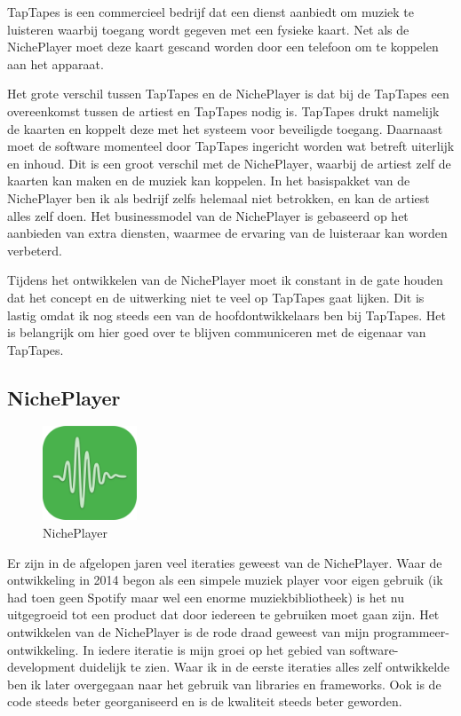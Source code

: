 TapTapes is een commercieel bedrijf dat een dienst aanbiedt om muziek te luisteren waarbij toegang wordt gegeven met een fysieke kaart. Net als de NichePlayer moet deze kaart gescand worden door een telefoon om te koppelen aan het apparaat.

Het grote verschil tussen TapTapes en de NichePlayer is dat bij de TapTapes een overeenkomst tussen de artiest en TapTapes nodig is. TapTapes drukt namelijk de kaarten  en koppelt deze met het systeem voor beveiligde toegang. Daarnaast moet de software momenteel door TapTapes ingericht worden wat betreft uiterlijk en inhoud. Dit is een groot verschil met de NichePlayer, waarbij de artiest zelf de kaarten kan maken en de muziek kan koppelen. In het basispakket van de NichePlayer ben ik als bedrijf zelfs helemaal niet betrokken, en kan de artiest alles zelf doen. Het businessmodel van de NichePlayer is gebaseerd op het aanbieden van extra diensten, waarmee de ervaring van de luisteraar kan worden verbeterd.

Tijdens het ontwikkelen van de NichePlayer moet ik constant in de gate houden dat het concept en de uitwerking niet te veel op TapTapes gaat lijken. Dit is lastig omdat ik nog steeds een van de hoofdontwikkelaars ben bij TapTapes. Het is belangrijk om hier goed over te blijven communiceren met de eigenaar van TapTapes.

\subsection{NichePlayer}
\begin{figure}
    \centering
    \includegraphics[width=0.25\textwidth]{assets/critical-review/NichePlayer.png}
    \caption{NichePlayer}
    \label{fig:critical-review:NichePlayer}
\end{figure}

Er zijn in de afgelopen jaren veel iteraties geweest van de NichePlayer. Waar de ontwikkeling in 2014 begon als een simpele muziek player voor eigen gebruik (ik had toen geen Spotify maar wel een enorme muziekbibliotheek) is het nu uitgegroeid tot een product dat door iedereen te gebruiken moet gaan zijn. Het ontwikkelen van de NichePlayer is de rode draad geweest van mijn programmeer-ontwikkeling. In iedere iteratie is mijn groei op het gebied van software-development duidelijk te zien. Waar ik in de eerste iteraties alles zelf ontwikkelde ben ik later overgegaan naar het gebruik van libraries en frameworks. Ook is de code steeds beter georganiseerd en is de kwaliteit steeds beter geworden.

